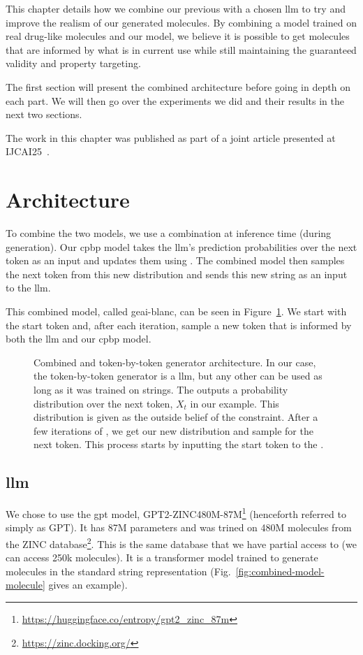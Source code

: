 \documentclass[../Document.tex]{subfiles}
\begin{document}
\label{chap:gpt+cp}
This chapter details how we combine our previous \cp with a chosen \gls{llm} to try and improve the realism of our generated molecules. By combining a model trained on real drug-like molecules and our \cp model, we believe it is possible to get molecules that are informed by what is in current use while still maintaining the guaranteed validity and property targeting.

The first section will present the combined architecture before going in depth on each part. We will then go over the experiments we did and their results in the next two sections.

The work in this chapter was published as part of a joint article presented at IJCAI25~\cite{ijcai:saikali}.

\section{Architecture}
To combine the two models, we use a combination at inference time (\ie during generation). Our \gls{cpbp} model takes the \gls{llm}'s prediction probabilities over the next token as an input and updates them using \bp. The combined model then samples the next token from this new distribution and sends this new string as an input to the \gls{llm}.

This combined model, called \gls{geai-blanc}, can be seen in Figure~\ref{fig:combined-architecture}. We start with the start token and, after each iteration, sample a new token that is informed by both the \gls{llm} and our \gls{cpbp} model.

\begin{figure}
    \centering
    
    \caption[Combined \cp and token-by-token generator architecture.]{Combined \cp and token-by-token generator architecture. In our case, the token-by-token generator is a \gls{llm}, but any other can be used as long as it was trained on \smiles strings. The \nn outputs a probability distribution over the next token, $X_t$ in our example. This distribution is given as the outside belief of the \oracle constraint. After a few iterations of \bp, we get our new distribution and sample for the next token. This process starts by inputting the start token to the \nn.}
    \label{fig:combined-architecture}
\end{figure}

\subsection{\gls{llm}}
We chose to use the \gls{gpt} model, GPT2-ZINC480M-87M\footnote{\url{https://huggingface.co/entropy/gpt2_zinc_87m}} (henceforth referred to simply as GPT).
It has 87M parameters and was trined on 480M molecules from the ZINC database\footnote{\url{https://zinc.docking.org/}}.
This is the same database that we have partial access to (we can access 250k molecules).
It is a transformer model trained to generate molecules in the standard string representation \smiles (Fig.~\ref{fig:combined-model-molecule} gives an example).
\end{document}
